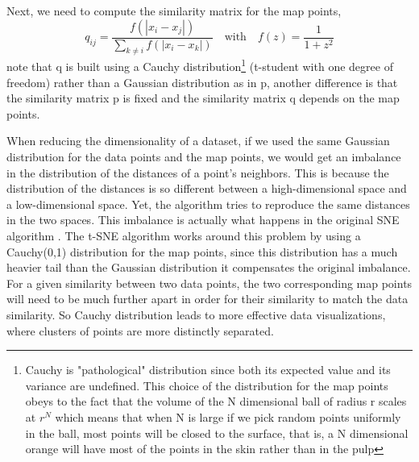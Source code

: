 \documentclass[11pt]{article}
\begin{document}
Next, we need to compute the similarity matrix for the map points,
\begin{equation}
q_{ij} = \frac{f(\left| x_i - x_j\right|)}{\displaystyle\sum_{k \neq i} f(\left| x_i - x_k\right|)} \quad \textrm{with} \quad f(z) = \frac{1}{1+z^2}
\end{equation}
note that q is built using a Cauchy distribution\footnote{Cauchy is "pathological" distribution since both its expected value and its variance are undefined. This choice of the distribution for the map points obeys to the fact that the volume of the N dimensional ball of radius r scales at $r^N$ which means that when N is large if we pick random points uniformly in the ball, most points will be closed to the surface, that is, a N dimensional orange will have most of the points in the skin rather than in the pulp} 
(t-student with one degree of freedom) rather than a Gaussian distribution as in p, another difference is that the similarity matrix p is fixed and the similarity matrix q depends on the map points. 



When reducing the dimensionality of a dataset, if we used the same Gaussian distribution for the data points and the map points, we would get an imbalance in the distribution of the distances of a point's neighbors. This is because the distribution of the distances is so different between a high-dimensional space and a low-dimensional space. Yet, the algorithm tries to reproduce the same distances in the two spaces. This imbalance is actually what happens in the original SNE algorithm \cite{hinton2003stochastic}.
The t-SNE algorithm works around this problem by using a Cauchy(0,1) distribution for the map points, since this distribution has a much heavier tail than the Gaussian distribution it compensates the original imbalance. For a given similarity between two data points, the two corresponding map points will need to be much further apart in order for their similarity to match the data similarity. So Cauchy distribution leads to more effective data visualizations, where clusters of points are more distinctly separated.
\end{document}

